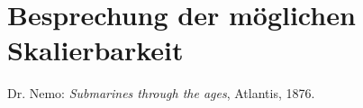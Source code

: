 \documentclass[a4paper,
DIV=13,
12pt,
BCOR=10mm,
department=FakIM,
oneside,
parskip=half,
automark,
listof=totocnumbered,
bibliography=totocnumbered,
acronym=totocnumbered
] {OTHRartcl}
\begin{document}
\section{Besprechung der möglichen Skalierbarkeit}



\begin{appendix}
\newpage
\listoffigures

\cleardoublepage
\newpage
\begin{thebibliography}{99}
 Dr. Nemo: \textit{Submarines through the ages}, Atlantis, 1876.
\end{thebibliography}

\cleardoublepage
\makedeclaration
\end{appendix}
\end{document}

